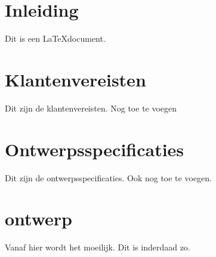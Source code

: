 \documentclass{article}
\begin{document}
\section{Inleiding}

Dit is een \LaTeX document.

\section{Klantenvereisten}

Dit zijn de klantenvereisten.
Nog toe te voegen

\section{Ontwerpsspecificaties}

Dit zijn de ontwerpsspecificaties.
Ook nog toe te voegen.

\section{ontwerp}

Vanaf hier wordt het moeilijk.
Dit is inderdaad zo.
\end{document}
